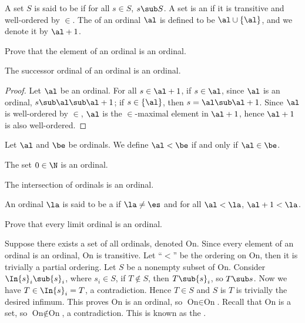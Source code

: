 \documentclass[10pt]{article}
\begin{document}
\begin{definition}
    A set $S$ is said to be  if for all $s\in S$, $s\sub S$. A set is an  if it is transitive and well-ordered by $\in$. The  of an ordinal $\al$ is defined to be $\al\cup\{\al\}$, and we denote it by $\al+1$. 
\end{definition}
\begin{problem}
    Prove that the element of an ordinal is an ordinal.
\end{problem}
\begin{proposition}
    The successor ordinal of an ordinal is an ordinal.
\end{proposition}
\begin{proof}
    Let $\al$ be an ordinal. For all $s\in\al+1$, if $s\in\al$, since $\al$ is an ordinal, $s\sub\al\sub\al+1$; if $s\in\{\al\}$, then $s=\al\sub\al+1$. Since $\al$ is well-ordered by $\in$, $\al$ is the $\in$-maximal element in $\al+1$, hence $\al+1$ is also well-ordered.
\end{proof}
\par
Let $\al$ and $\be$ be ordinals. We define $\al<\be$ if and only if $\al\in\be$.
\begin{example}
    The set $0\in\N$ is an ordinal.
\end{example}
\begin{problem}
    The intersection of ordinals is an ordinal.
\end{problem}
\begin{definition}
    An ordinal $\la$ is said to be a  if $\la\ne\es$ and for all $\al<\la$, $\al+1<\la$.
\end{definition}
\begin{problem}
    Prove that every limit ordinal is an ordinal.
\end{problem}
\par
Suppose there exists a set of all ordinals, denoted $\text{On}$. Since every element of an ordinal is an ordinal, $\text{On}$ is transitive. Let ``$<$'' be the ordering on $\text{On}$, then it is trivially a partial ordering. Let $S$ be a nonempty subset of $\text{On}$. Consider $\In{s}_{i}\sub{s}_{i}$, where ${s}_{i}\in S$, if $T\notin S$, then $T\sub{s}_{i}$, so $T\sub s$. Now we have $T\in\In{s}_{i}=T$, a contradiction. Hence $T\in S$ and $S$ is $T$ is trivially the desired infimum. This proves $\text{On}$ is an ordinal, so $\text{On}\in\text{On}$. Recall that $\text{On}$ is a set, so $\text{On}\notin\text{On}$, a contradiction. This is known as the .
\end{document}
